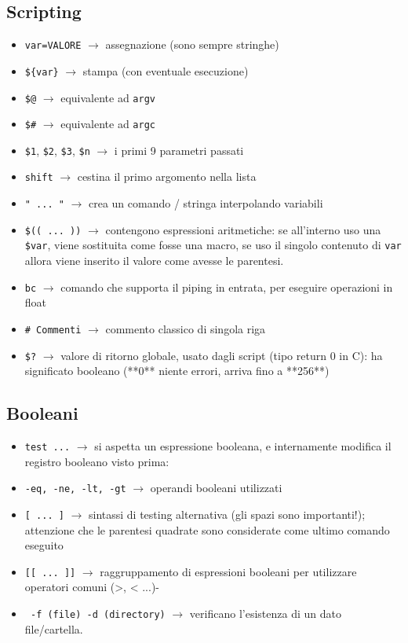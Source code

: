 \documentclass[a4paper]{article}
\begin{document}
\subsection{Scripting}
\begin{itemize}
\item\verb|var=VALORE| $\rightarrow$ assegnazione (sono sempre stringhe)
\item\verb|${var}| $\rightarrow$ stampa (con eventuale esecuzione)
\item\verb|$@| $\rightarrow$ equivalente ad \verb|argv|
\item\verb|$#| $\rightarrow$ equivalente ad \verb|argc|
\item\verb|$1|, \verb|$2|, \verb|$3|, \verb|$n| $\rightarrow$ i primi 9 parametri passati
\item\verb|shift| $\rightarrow$ cestina il primo argomento nella lista
\item\verb|" ... "| $\rightarrow$ crea un comando / stringa interpolando variabili
\item\verb|$(( ... ))| $\rightarrow$ contengono espressioni aritmetiche: se all'interno uso una \verb|$var|, viene sostituita come fosse una macro, se uso il singolo contenuto di \verb|var| allora viene inserito il valore come avesse le parentesi.
\item\verb|bc| $\rightarrow$ comando che supporta il piping in entrata, per eseguire operazioni in float
\item\verb|# Commenti| $\rightarrow$ commento classico di singola riga
\item\verb|$?| $\rightarrow$ valore di ritorno globale, usato dagli script (tipo return 0 in C): ha significato booleano (**0** niente errori, arriva fino a **256**)
\end{itemize}

\subsection{Booleani}
\begin{itemize}
\item\verb|test ...| $\rightarrow$ si aspetta un espressione booleana, e internamente modifica il registro booleano visto prima:
\item\verb|-eq, -ne, -lt, -gt| $\rightarrow$ operandi booleani utilizzati
\item\verb|[ ... ]| $\rightarrow$ sintassi di testing alternativa (gli spazi sono importanti!); attenzione che le parentesi quadrate sono considerate come ultimo comando eseguito
\item\verb|[[ ... ]]| $\rightarrow$ raggruppamento di espressioni booleani per utilizzare operatori comuni (>, < ...)- 
\item\verb| -f (file) -d (directory)| $\rightarrow$ verificano l'esistenza di un dato file/cartella. 
\end{itemize}
\end{document}
